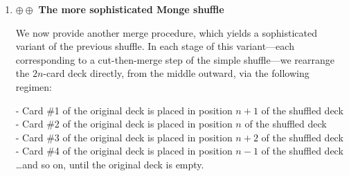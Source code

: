 \begin{enumerate}
\begin{enumerate}
  \item $\oplus \oplus$ {\bf The more sophisticated Monge shuffle}

\smallskip

We now provide another merge procedure, which yields a sophisticated variant of the previous shuffle.  In each stage of this variant---each corresponding to a cut-then-merge step of the simple shuffle---we rearrange the $2n$-card deck directly, from the middle outward, via the following regimen:

\smallskip

\noindent
- Card \#1 of the original deck is placed in position $n+1$ of the shuffled deck \\
- Card \#2 of the original deck is placed in position $n$ of the shuffled deck \\
- Card \#3 of the original deck is placed in position $n+2$ of the shuffled deck \\
- Card \#4 of the original deck is placed in position $n-1$ of the shuffled deck \\
\hspace*{.1in} \ldots and so on, until the original deck is empty.

\smallskip


\end{enumerate}
\end{enumerate}
